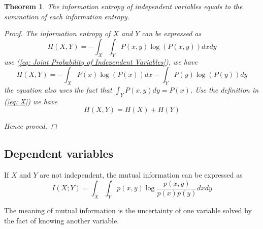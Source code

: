 \documentclass[a4paper]{article}
\newtheorem{theorem}{Theorem}[section]
\begin{document}
\begin{theorem}
    The information entropy of independent variables equals to the summation of each information entropy.

    \begin{proof}
        The information entropy of $X$ and $Y$ can be expressed as
        \begin{equation}
            H(X, Y) = - \int_{X} \int_{Y} P(x, y) \log(P(x, y)) dx dy
        \end{equation}
        use (\ref{eq: Joint Probability of Independent Variables}), we have
        \begin{equation}
            H(X, Y) = - \int_{X} P(x) \log(P(x)) dx - \int_{Y} P(y) \log(P(y)) dy
        \end{equation}
        the equation also uses the fact that $\int_{Y} P(x, y) dy = P(x)$.
        Use the definition in (\ref{eq: X}) we have
        \begin{equation*}
            H(X, Y) = H(X) + H(Y)
        \end{equation*}

        Hence proved.
    \end{proof}

\end{theorem}

\subsection{Dependent variables}
If $X$ and $Y$ are not independent, the mutual information can be expressed as
\begin{equation}
    I(X; Y) = \int_{X} \int_{Y} p(x, y) \log{\frac{p(x, y)}{p(x)p(y)} dx dy}
    \label{eq: Multual Information}
\end{equation}

The meaning of mutual information is the uncertainty of one variable solved by the fact of knowing another variable.
\end{document}

